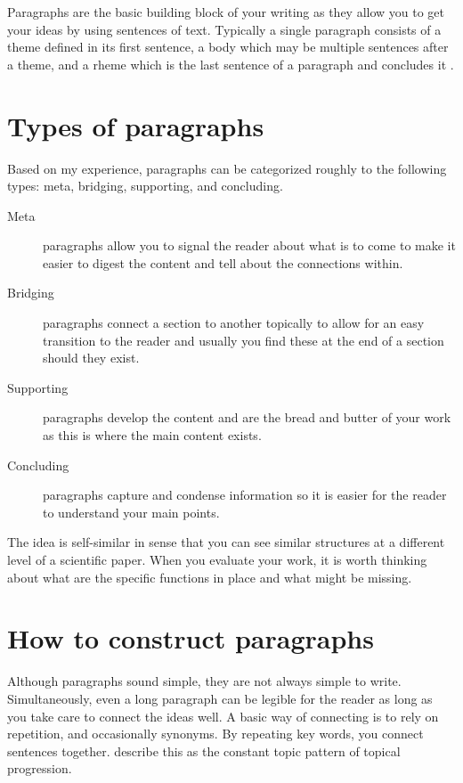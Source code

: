 Paragraphs are the basic building block of your writing as they allow you to get your ideas by using sentences of text.
Typically a single paragraph consists of a theme defined in its first sentence, a body which may be multiple sentences after a theme, and a rheme which is the last sentence of a paragraph and concludes it \citep{rustipa2010theme}.

\section{Types of paragraphs}

Based on my experience, paragraphs can be categorized roughly to the following types: meta, bridging, supporting, and concluding.

\begin{description}
    \item[Meta] paragraphs allow you to signal the reader about what is to come to make it easier to digest the content and tell about the connections within.
    \item[Bridging] paragraphs connect a section to another topically to allow for an easy transition to the reader and usually you find these at the end of a section should they exist.
    \item[Supporting] paragraphs develop the content and are the bread and butter of your work as this is where the main content exists.
    \item[Concluding] paragraphs capture and condense information so it is easier for the reader to understand your main points.
\end{description}

The idea is self-similar in sense that you can see similar structures at a different level of a scientific paper.
When you evaluate your work, it is worth thinking about what are the specific functions in place and what might be missing.

\section{How to construct paragraphs}

Although paragraphs sound simple, they are not always simple to write.
Simultaneously, even a long paragraph can be legible for the reader as long as you take care to connect the ideas well.
A basic way of connecting is to rely on repetition, and occasionally synonyms.
By repeating key words, you connect sentences together.
\citet{aaltoFourPatterns} describe this as the constant topic pattern of topical progression.

